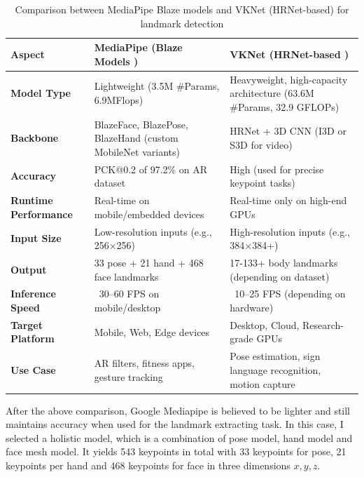 \documentclass{article}
\begin{document}
\begin{table}[H]
\centering
\renewcommand{\arraystretch}{1.4}
\begin{tabular}{|>{\bfseries}l|p{5cm}|p{5cm}|}
\hline
\textbf{Aspect} & \textbf{MediaPipe (Blaze Models \cite{bazarevsky2020blazepose})} & \textbf{VKNet (HRNet-based \cite{sun2019deep})} \\
\hline
\textbf{Model Type} & Lightweight (3.5M \#Params, 6.9MFlops) & Heavyweight, high-capacity architecture (63.6M \#Params, 32.9 GFLOPs)\\
\hline
\textbf{Backbone} & BlazeFace, BlazePose, BlazeHand (custom MobileNet variants) & HRNet + 3D CNN (I3D or S3D for video) \\
\hline
\textbf{Accuracy} & PCK@0.2 of 97.2\% on AR dataset & High (used for precise keypoint tasks) \\
\hline
\textbf{Runtime Performance} & Real-time on mobile/embedded devices & Real-time only on high-end GPUs \\
\hline
\textbf{Input Size} & Low-resolution inputs (e.g., 256×256) & High-resolution inputs (e.g., 384×384+) \\
\hline
\textbf{Output} & 33 pose + 21 hand + 468 face landmarks & 17-133+ body landmarks (depending on dataset) \\
\hline
\textbf{Inference Speed} & ~30–60 FPS on mobile/desktop & ~10–25 FPS (depending on hardware) \\
\hline
\textbf{Target Platform} & Mobile, Web, Edge devices & Desktop, Cloud, Research-grade GPUs \\
\hline
\textbf{Use Case} & AR filters, fitness apps, gesture tracking & Pose estimation, sign language recognition, motion capture \\
\hline
\end{tabular}
\caption{Comparison between MediaPipe Blaze models and VKNet (HRNet-based) for landmark detection}
\end{table}

After the above comparison, Google Mediapipe is believed to be lighter and still maintains accuracy when used for the landmark extracting task. In this case, I selected a holistic model, which is a combination of pose model, hand model and face mesh model. It yields 543 keypoints in total with 33 keypoints for pose, 21 keypoints per hand and 468 keypoints for face in three dimensions $x, y, z$.
\end{document}
